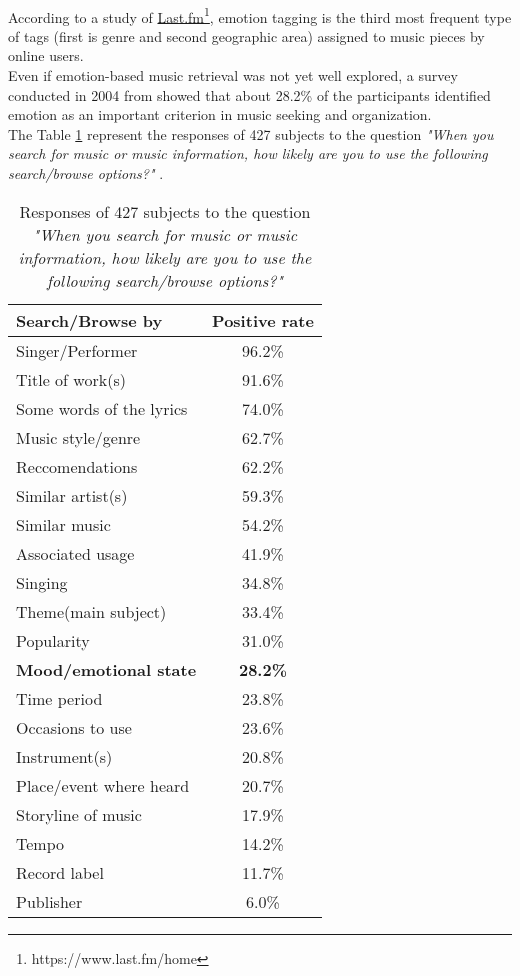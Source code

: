 \\
According to a study of \href{https://www.last.fm/home}{Last.fm}\footnote{https://www.last.fm/home}, emotion tagging is the third most frequent type of tags (first is genre and second geographic area) assigned to music pieces by online users.
\\ Even if emotion-based music retrieval was not yet well explored, a survey conducted in 2004 from \cite{lee2004survey} showed that about 28.2\% of the participants identified emotion as an important criterion in music seeking and organization.
\\
The Table \ref{table:browse_music} represent the responses of 427 subjects to the question \textit{"When you search for music or music information, how likely are you to use the following search/browse options?"} \cite{lee2004survey}.
\begin{table}[h!]
	\centering
	\begin{tabular}{|l | c|}
		\hline
		Search/Browse by & Positive rate\\ [0.5ex] 
		\hline\hline Singer/Performer 			&		96.2\%	\\ 
		\hline	Title of work(s) 					& 		91.6\%	\\ 
		\hline	Some words of the lyrics 	& 		74.0\% 	\\
		\hline	Music style/genre 				&		62.7\%	\\
		\hline	Reccomendations 				&		62.2\%	\\
		\hline	Similar artist(s)					&		59.3\%	\\
		\hline	Similar music 					&		54.2\%	\\
		\hline	Associated usage				&		41.9\% 	\\
		\hline	Singing								&		34.8\% 	\\
		\hline	Theme(main subject)			&		33.4\% 	\\
		\hline	Popularity							&		31.0\% 	\\
		\hline	\textbf{Mood/emotional state	}	&		\textbf{28.2\%} 	\\
		\hline	Time period						&		23.8\% 	\\
		\hline	Occasions to use				&		23.6\% 	\\
		\hline	Instrument(s)					&		20.8\% 	\\
		\hline	Place/event where heard	&		20.7\% 	\\
		\hline	Storyline of music				&		17.9\% 	\\
		\hline	Tempo								&		14.2\% 	\\
		\hline	Record label						&		11.7\% 	\\
		\hline	Publisher							&		6.0\% 	\\
		\hline
	\end{tabular}
	\caption{Responses of 427 subjects to the question \textit{"When you search for music or music information, how likely are you to use the following search/browse options?"}}
	\label{table:browse_music}
\end{table}
